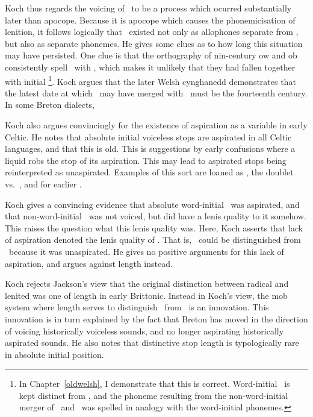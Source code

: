 Koch thus regards the voicing of \lT\ to be a process which ocurred substantially later than apocope. Because it is apocope which causes the phonemicisation of lenition, it follows logically that \lT\ existed not only as allophones separate from \xD, but also as separate phonemes. He gives some clues as to how long this situation may have persisted. One clue is that the orthography of nin-century \gls{ow} and \gls{ob} consistently spell \lT\ with , which makes it unlikely that they had fallen together with initial \xD\footnote{In Chapter~\ref{oldwelsh}, I demonstrate that this is correct. Word-initial \lT\ is kept distinct from \xD, and the phoneme resulting from the non-word-initial merger of \lT\ and \xD\ was spelled in analogy with the word-initial phonemes.}. Koch argues that the later Welsh cynghanedd demonstrates that the latest date at which \lT\ may have merged with \xD\ must be the fourteenth century. In some Breton dialects, 

Koch also argues convincingly for the existence of aspiration as a variable in early Celtic. He notes that absolute initial voiceless stops are aspirated in all Celtic languages, and that this is old. This is suggestions by early confusions where a liquid robs the stop of its aspiration. This may lead to aspirated stops being reinterpreted as unaspirated. Examples of this sort are   loaned as , the doublet  vs.~, and  for earlier .

Koch gives a convincing evidence that absolute word-initial \xT\ was aspirated, and that non-word-initial \lT\ was not voiced, but did have a lenis quality to it somehow. This raises the question what this lenis quality was. Here, Koch asserts that lack of aspiration denoted the lenis quality of \lT. That is, \lT\ could be distinguished from \xT\ because it was unaspirated. He gives no positive arguments for this lack of aspiration, and argues against length instead.

Koch rejects Jackson's view that the original distinction between radical and lenited was one of length in early Brittonic. Instead in Koch's view, the \gls{mob} system where length serves to distinguish \lT\ from \xD\ is an innovation. This innovation is in turn explained by the fact that Breton has moved in the direction of voicing historically voiceless sounds, and no longer aspirating historically aspirated sounds. He also notes that distinctive stop length is typologically rare in absolute initial position. 

